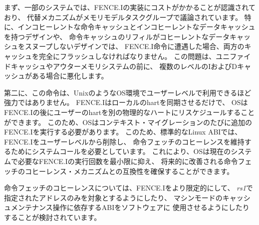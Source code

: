 \begin{commentary}
まず、一部のシステムでは、FENCE.Iの実装にコストがかかることが認識されており、
代替メカニズムがメモリモデルタスクグループで議論されています。 
特に、インコヒーレントな命令キャッシュとインコヒーレントなデータキャッシュを持つデザインや、
命令キャッシュのリフィルがコヒーレントなデータキャッシュをスヌープしないデザインでは、
FENCE.I命令に遭遇した場合、両方のキャッシュを完全にフラッシュしなければなりません。 
この問題は、ユニファイドキャッシュやアウターメモリシステムの前に、
複数のレベルのIおよびDキャッシュがある場合に悪化します。

\begin{comment}
Second, the instruction is not powerful enough to make available at
user level in a Unix-like operating system environment.  The FENCE.I
only synchronizes the local hart, and the OS can reschedule the user
hart to a different physical hart after the FENCE.I.  This would
require the OS to execute an additional FENCE.I as part of every
context migration.  For this reason, the standard Linux ABI has
removed FENCE.I from user-level and now requires a system call to
maintain instruction-fetch coherence, which allows the OS to minimize
the number of FENCE.I executions required on current systems and
provides forward-compatibility with future improved instruction-fetch
coherence mechanisms.
\end{comment}

第二に、この命令は、UnixのようなOS環境でユーザーレベルで利用できるほど強力ではありません。 
FENCE.Iはローカルのhartを同期させるだけで、
OSはFENCE.Iの後にユーザーのhartを別の物理的なハートにリスケジュールすることができます。
このため、OSはコンテキスト・マイグレーションのたびに追加のFENCE.Iを実行する必要があります。
このため、標準的なLinux ABIでは、FENCE.Iをユーザーレベルから削除し、
命令フェッチのコヒーレンスを維持するためにシステムコールを必要としています。
これにより、OSは現在のシステムで必要なFENCE.Iの実行回数を最小限に抑え、
将来的に改善される命令フェッチのコヒーレンス・メカニズムとの互換性を確保することができます。 

\begin{comment}
Future approaches to instruction-fetch coherence under discussion
include providing more restricted versions of FENCE.I that only target
a given address specified in {\em rs1}, and/or allowing software to use an
ABI that relies on machine-mode cache-maintenance operations.
\end{comment}

命令フェッチのコヒーレンスについては、FENCE.Iをより限定的にして、
{\em rs1}で指定されたアドレスのみを対象とするようにしたり、
マシンモードのキャッシュメンテナンス操作に依存するABIをソフトウェアに
使用させるようにしたりすることが検討されています。
\end{commentary}

